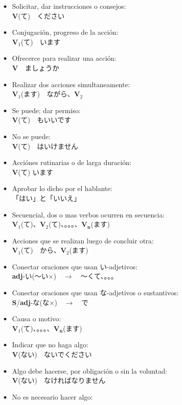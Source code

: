 \documentclass[a4paper,12pt,oneside]{report}
\def\to{$\longrightarrow$}
\def\bv{\textbf{V}} %
\def\bs{\textbf{S}} %
\def\adj{\textbf{adj}} %
\def\vi{$\mathrm{\bv}_1$} %
\def\vn{$\mathrm{\bv}_2$} %
\def\vene{$\mathrm{\bv}_\mathrm{\textbf{n}}$} %
\def\tenten{。。。}
\begin{document}
\begin{CJK*}{UTF8}{min}
  \begin{itemize}
    \item Solicitar, dar instrucciones o consejos:\\
          \bv(て)　ください
    \item Conjugaci\'on, progreso de la acci\'on:\\
          \vi(て)　います
    \item Ofrecerce para realizar una acci\'on:\\
          \bv　ましょうか
    \item Realizar dos acciones simultaneamente:\\
          \vi(ます)　ながら、\vn
    \item Se puede; dar permiso:\\
          \bv(て)　もいいです
    \item No se puede:\\
          \bv(て)　はいけません
    \item Acci\'ones rutinarias o de larga duraci\'on:\\
          \bv(て) います
    \item Aprobar lo dicho por el hablante:\\
          「はい」と「いいえ」
    \item Secuencial, dos o mas verbos ocurren en secuencia:\\
          \vi(て)、\vn(て)、\tenten、\vene(ます)
    \item Acciones que se realizan luego de concluir otra:\\
          \vi(て)　から、\vn(ます)
    \item Conectar oraciones que usan い-adjetivos:\\
          \adj-い(〜い×)　\to　〜くて、\tenten
    \item Conectar oraciones que usan な-adjetivos o sustantivos:\\
          \bs/\adj-な(な×)　\to　で
    \item Causa o motivo:\\
          \vi(て)、\tenten、\vene(ます)
    \item Indicar que no haga algo:\\
          \bv(ない)　ないでください
    \item Algo debe hacerse, por obligación o sin la voluntad:\\
          \bv(ない)　なければなりません
    \item No es necesario hacer algo:\\

\end{itemize}
\end{CJK*}
\end{document}
